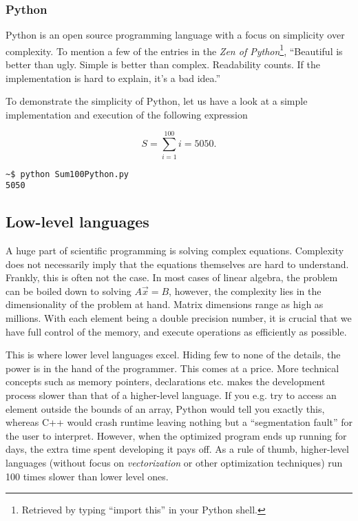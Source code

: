 \subsubsection{Python}
\label{sec:Python}

Python is an open source programming language with a focus on simplicity over complexity. To mention a few of the entries in the \textit{Zen of Python}\footnote{Retrieved by typing ``import this'' in your Python shell.}, ``Beautiful is better than ugly. Simple is better than complex. Readability counts. If the implementation is hard to explain, it's a bad idea.''

To demonstrate the simplicity of Python, let us have a look at a simple implementation and execution of the following expression

\[
 S = \sum_{i=1}^{100} i = 5050.  \label{eq:sum100}
\]




\begin{verbatim}
~$ python Sum100Python.py 
5050
\end{verbatim}




\subsection{Low-level languages}
\label{sec:lowlevel}

A huge part of scientific programming is solving complex equations. Complexity does not necessarily imply that the equations themselves are hard to understand. Frankly, this is often not the case. In most cases of linear algebra, the problem can be boiled down to solving $A\vec x = B$, however, the complexity lies in the dimensionality of the problem at hand. Matrix dimensions range as high as millions. With each element being a double precision number, it is crucial that we have full control of the memory, and execute operations as efficiently as possible. 

This is where lower level languages excel. Hiding few to none of the details, the power is in the hand of the programmer. This comes at a price. More technical concepts such as memory pointers, declarations etc. makes the development process slower than that of a higher-level language. If you e.g. try to access an element outside the bounds of an array, Python would tell you exactly this, whereas C++ would crash runtime leaving nothing but a ``segmentation fault'' for the user to interpret. However, when the optimized program ends up running for days, the extra time spent developing it pays off. As a rule of thumb, higher-level languages (without focus on \textit{vectorization} or other optimization techniques) run 100 times slower than lower level ones. 

